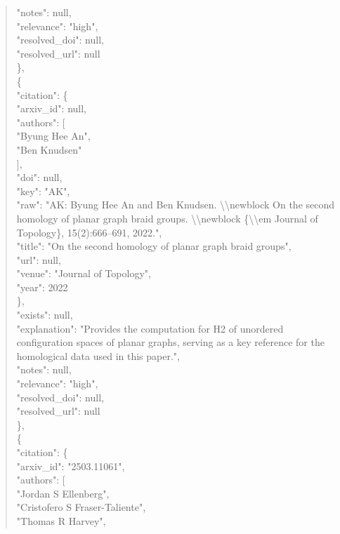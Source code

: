 \documentclass[11pt]{article}
\begin{document}
\begin{quote}
      "notes": null,\\
      "relevance": "high",\\
      "resolved\_doi": null,\\
      "resolved\_url": null\\
    \},\\
    \{\\
      "citation": \{\\
        "arxiv\_id": null,\\
        "authors": [\\
          "Byung Hee An",\\
          "Ben Knudsen"\\
        ],\\
        "doi": null,\\
        "key": "AK",\\
        "raw": "AK: Byung Hee An and Ben Knudsen. \textbackslash{}\textbackslash{}newblock On the second homology of planar graph braid groups. \textbackslash{}\textbackslash{}newblock \{\textbackslash{}\textbackslash{}em Journal of Topology\}, 15(2):666--691, 2022.",\\
        "title": "On the second homology of planar graph braid groups",\\
        "url": null,\\
        "venue": "Journal of Topology",\\
        "year": 2022\\
      \},\\
      "exists": null,\\
      "explanation": "Provides the computation for H2 of unordered configuration spaces of planar graphs, serving as a key reference for the homological data used in this paper.",\\
      "notes": null,\\
      "relevance": "high",\\
      "resolved\_doi": null,\\
      "resolved\_url": null\\
    \},\\
    \{\\
      "citation": \{\\
        "arxiv\_id": "2503.11061",\\
        "authors": [\\
          "Jordan S Ellenberg",\\
          "Cristofero S Fraser-Taliente",\\
          "Thomas R Harvey",\\

\end{quote}
\end{document}
